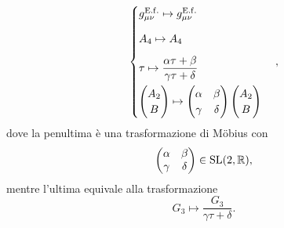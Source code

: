 \begin{equation}
    \begin{cases}
        g_{\mu\nu}^{\mathrm{E.f.}} \mapsto g_{\mu\nu}^{\mathrm{E.f.}} \\[2ex]
        A_4 \mapsto A_4 \\[2ex]
        \tau \mapsto \dfrac{\alpha\tau + \beta}{\gamma\tau + \delta} \\[2ex]
        \begin{pmatrix}
            A_ 2 \\
            B
        \end{pmatrix} \mapsto 
        \begin{pmatrix}
            \alpha & \beta \\
            \gamma & \delta 
        \end{pmatrix}
        \begin{pmatrix}
            A_2 \\
            B
        \end{pmatrix}
    \end{cases},
\end{equation}
dove la penultima è una trasformazione di M\"obius con 
\begin{equation}
    \begin{pmatrix}
        \alpha & \beta \\
        \gamma & \delta 
    \end{pmatrix} \in \mathrm{SL}(2,\mathbb{R}),
\end{equation}
mentre l'ultima equivale alla trasformazione 
\begin{equation}
    G_3 \mapsto \frac{G_3}{\gamma\tau + \delta}.
\end{equation}

